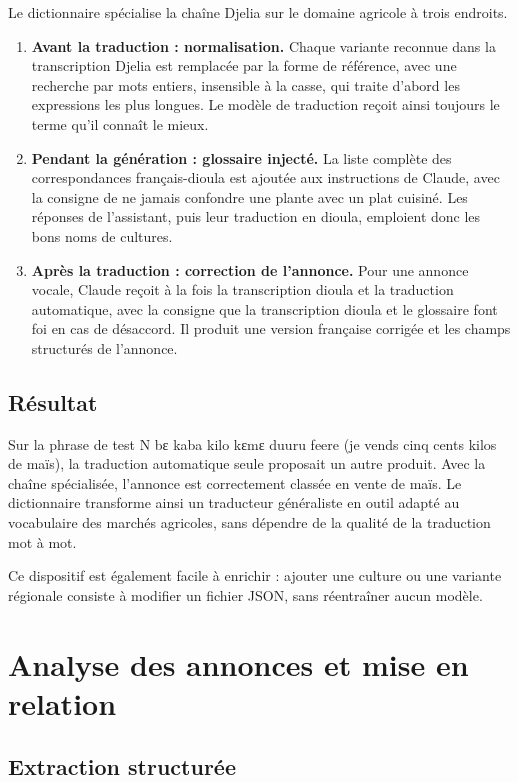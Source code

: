 \documentclass[12pt,a4paper]{article}
\begin{document}
Le dictionnaire spécialise la chaîne Djelia sur le domaine agricole à trois endroits.

\begin{enumerate}
  \item \textbf{Avant la traduction : normalisation.} Chaque variante reconnue dans la transcription
  Djelia est remplacée par la forme de référence, avec une recherche par mots entiers, insensible à
  la casse, qui traite d'abord les expressions les plus longues. Le modèle de traduction reçoit ainsi
  toujours le terme qu'il connaît le mieux.
  \item \textbf{Pendant la génération : glossaire injecté.} La liste complète des correspondances
  français-dioula est ajoutée aux instructions de Claude, avec la consigne de ne jamais confondre
  une plante avec un plat cuisiné. Les réponses de l'assistant, puis leur traduction en dioula,
  emploient donc les bons noms de cultures.
  \item \textbf{Après la traduction : correction de l'annonce.} Pour une annonce vocale, Claude reçoit
  à la fois la transcription dioula et la traduction automatique, avec la consigne que la
  transcription dioula et le glossaire font foi en cas de désaccord. Il produit une version française
  corrigée et les champs structurés de l'annonce.
\end{enumerate}

\subsection{Résultat}

Sur la phrase de test \og N bɛ kaba kilo kɛmɛ duuru feere \fg{} (je vends cinq cents kilos de maïs),
la traduction automatique seule proposait un autre produit. Avec la chaîne spécialisée, l'annonce
est correctement classée en vente de maïs. Le dictionnaire transforme ainsi un traducteur généraliste
en outil adapté au vocabulaire des marchés agricoles, sans dépendre de la qualité de la traduction
mot à mot.

Ce dispositif est également facile à enrichir : ajouter une culture ou une variante régionale
consiste à modifier un fichier JSON, sans réentraîner aucun modèle.

\section{Analyse des annonces et mise en relation}

\subsection{Extraction structurée}
\end{document}
